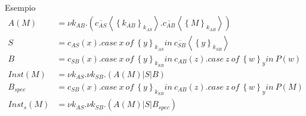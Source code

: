 \documentclass{beamer}
\theoremstyle{plain}
\theoremstyle{definition}
\theoremstyle{remark}
\newcommand{\obar}[1]{\overline{#1}}
\newcommand{\set}[1]{\left\{#1\right\}}
\newcommand{\pa}[1]{\left(#1\right)}
\newcommand{\ang}[1]{\left<#1\right>}
\begin{document}
\begin{frame}{Esempio}
  \begin{align*}
    A(M) & = \nu k_{AB}. \pa{
           \obar{c_{AS}}\ang{\set{k_{AB}}_{k_{AS}}}. \obar{c_{AB}}\ang{\set{M}_{k_{AB}}}}
    \\
    S & = c_{AS}(x).case\ x\ of\ \set{y}_{k_{AS}}in\ 
        \obar{c_{SB}}\ang{\set{y}_{k_{SB}}} \\ 
    B & = c_{SB}(x).case\ x\ of\ \set{y}_{k_{SB}}in\ c_{AB}(z). case\
        z\ of\ \set{w}_y in\ P(w) \\ 
    Inst(M) & = \nu k_{AS}. \nu k_{SB}. \pa{ A(M) | S | B } \\
    B_{spec} & = c_{SB}(x).case\ x\ of\ \set{y}_{k_{SB}}in\ 
               c_{AB}(z). case\ z\ of\ \set{w}_y in\ P(M) \\
    Inst_{s}(M) & = \nu k_{AS}. \nu k_{SB}. \pa{ A(M) | S | B_{spec}}
  \end{align*}
\end{frame}
\end{document}
